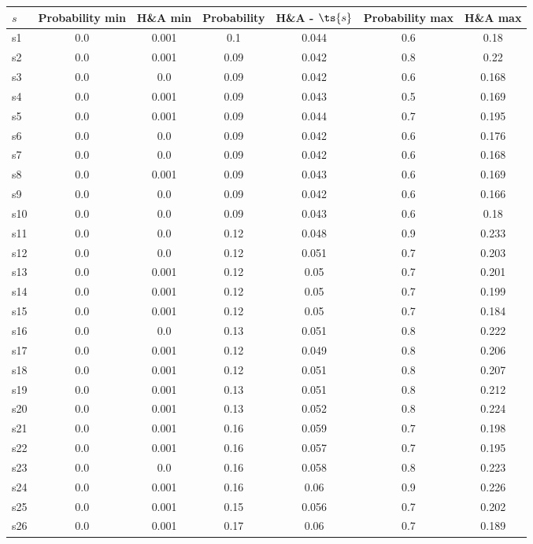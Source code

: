 \documentclass{article}
\begin{document}
\noindent\begin{tabular}{|l|c|c|c|c|c|c|}
\hline
$s$& Probability min & H\&A min & Probability & H\&A - $\ts{s}$ & Probability max & H\&A max\\
\hline
s1 &0.0 & 0.001 & 0.1 & 0.044 & 0.6 & 0.18\\
\hline
s2 &0.0 & 0.001 & 0.09 & 0.042 & 0.8 & 0.22\\
\hline
s3 &0.0 & 0.0 & 0.09 & 0.042 & 0.6 & 0.168\\
\hline
s4 &0.0 & 0.001 & 0.09 & 0.043 & 0.5 & 0.169\\
\hline
s5 &0.0 & 0.001 & 0.09 & 0.044 & 0.7 & 0.195\\
\hline
s6 &0.0 & 0.0 & 0.09 & 0.042 & 0.6 & 0.176\\
\hline
s7 &0.0 & 0.0 & 0.09 & 0.042 & 0.6 & 0.168\\
\hline
s8 &0.0 & 0.001 & 0.09 & 0.043 & 0.6 & 0.169\\
\hline
s9 &0.0 & 0.0 & 0.09 & 0.042 & 0.6 & 0.166\\
\hline
s10 &0.0 & 0.0 & 0.09 & 0.043 & 0.6 & 0.18\\
\hline
s11 &0.0 & 0.0 & 0.12 & 0.048 & 0.9 & 0.233\\
\hline
s12 &0.0 & 0.0 & 0.12 & 0.051 & 0.7 & 0.203\\
\hline
s13 &0.0 & 0.001 & 0.12 & 0.05 & 0.7 & 0.201\\
\hline
s14 &0.0 & 0.001 & 0.12 & 0.05 & 0.7 & 0.199\\
\hline
s15 &0.0 & 0.001 & 0.12 & 0.05 & 0.7 & 0.184\\
\hline
s16 &0.0 & 0.0 & 0.13 & 0.051 & 0.8 & 0.222\\
\hline
s17 &0.0 & 0.001 & 0.12 & 0.049 & 0.8 & 0.206\\
\hline
s18 &0.0 & 0.001 & 0.12 & 0.051 & 0.8 & 0.207\\
\hline
s19 &0.0 & 0.001 & 0.13 & 0.051 & 0.8 & 0.212\\
\hline
s20 &0.0 & 0.001 & 0.13 & 0.052 & 0.8 & 0.224\\
\hline
s21 &0.0 & 0.001 & 0.16 & 0.059 & 0.7 & 0.198\\
\hline
s22 &0.0 & 0.001 & 0.16 & 0.057 & 0.7 & 0.195\\
\hline
s23 &0.0 & 0.0 & 0.16 & 0.058 & 0.8 & 0.223\\
\hline
s24 &0.0 & 0.001 & 0.16 & 0.06 & 0.9 & 0.226\\
\hline
s25 &0.0 & 0.001 & 0.15 & 0.056 & 0.7 & 0.202\\
\hline
s26 &0.0 & 0.001 & 0.17 & 0.06 & 0.7 & 0.189\\

\end{tabular}
\end{document}
